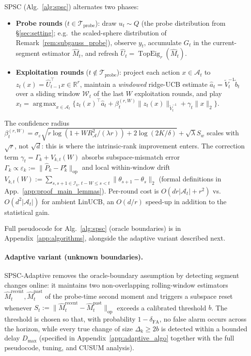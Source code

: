 \documentclass{article}
\newcommand{\R}{\mathbb{R}}
\newcommand{\op}{\mathrm{op}}
\newcommand{\cA}{\mathcal{A}}
\newcommand{\cI}{\mathcal{I}}
\newcommand{\cW}{\mathcal{W}}
\newcommand{\cTprobe}{\mathcal{T}_{\mathrm{probe}}}
\DeclareMathOperator{\TopEig}{TopEig}
\DeclareMathOperator*{\argmax}{arg\,max}
\begin{document}
SPSC (Alg.~\ref{alg:spsc}) alternates two phases:
\begin{itemize}[leftmargin=1.5em,nosep]
\item \textbf{Probe rounds} ($t\in\cTprobe$): draw $u_t\sim Q$ (the
probe distribution from \S\ref{sec:setting}; e.g.\ the scaled-sphere
distribution of Remark~\ref{rem:subgauss_probe}), observe $y_t$,
accumulate $G_t$ in the current-segment estimator $\widehat M_t$,
and refresh $\widehat U_t = \TopEig_r(\widehat M_t)$.
\item \textbf{Exploitation rounds} ($t\notin\cTprobe$): project each
action $x\in\cA_t$ to $z_t(x) = \widehat U_{t-1}^\top x\in\R^r$, maintain a
\emph{windowed} ridge-UCB estimate
$\widehat a_t = \widetilde V_t^{-1}\widetilde b_t$ over a sliding
window $\cW_t$ of the last $W$ exploitation rounds, and play
$x_t = \argmax_{x\in\cA_t}
\bigl\{ z_t(x)^\top\widehat a_t + \beta_t^{(r,W)}\|z_t(x)\|_{\widetilde V_t^{-1}}
+ \gamma_t \|x\|_2 \bigr\}$.
\end{itemize}
The confidence radius
$\beta_t^{(r,W)}=\sigma_\varepsilon\sqrt{r\log(1+WR_\cA^2/(\lambda r))
+2\log(2K/\delta)}+\sqrt{\lambda}S_w$
scales with $\sqrt{r}$, not $\sqrt{d}$: this is where the intrinsic-rank
improvement enters. The correction term
$\gamma_t = \Gamma_k + V_{k,t}(W)$
absorbs subspace-mismatch error
$\Gamma_k\propto\varepsilon_k:=\|\widehat P_k - P_k^\star\|_{\op}$
and local within-window drift
$V_{k,t}(W):=\sum_{s,s+1\in\cI_k,\,t-W\le s<t}\|\theta_{s+1}-\theta_s\|_2$
(formal definitions in App.~\ref{app:proof_main_lemmas}). Per-round cost is $O(dr|\cA_t|+r^2)$ vs.\
$O(d^2|\cA_t|)$ for ambient LinUCB, an $O(d/r)$ speed-up in addition
to the statistical gain.

Full pseudocode for Alg.~\ref{alg:spsc} (oracle boundaries) is in
Appendix~\ref{app:algorithms}, alongside the adaptive variant
described next.

\paragraph{Adaptive variant (unknown boundaries).}
SPSC-Adaptive removes the oracle-boundary assumption by detecting
segment changes online: it maintains two non-overlapping rolling-window
estimators $\widehat M_t^{\mathrm{recent}}, \widehat M_t^{\mathrm{past}}$ of
the probe-time second moment and triggers a subspace reset whenever
$S_t := \|\widehat M_t^{\mathrm{recent}} - \widehat M_t^{\mathrm{past}}\|_\op$
exceeds a calibrated threshold $b$. The threshold is chosen so that,
with probability $1-\delta_{\mathrm{FA}}$, no false alarm occurs across
the horizon, while every true change of size $\Delta_k \ge 2b$ is
detected within a bounded delay $D_{\max}$ (specified in
Appendix~\ref{app:adaptive_algo} together with the full pseudocode,
tuning, and CUSUM analysis).
\end{document}
